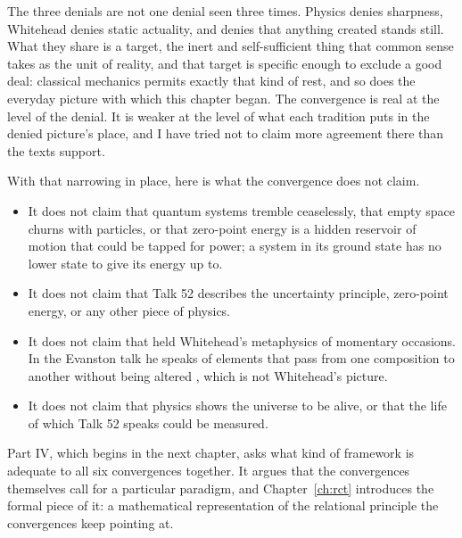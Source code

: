 The three denials are not one denial seen three times. Physics denies sharpness, Whitehead denies static actuality, and \AbdulBaha denies that anything created stands still. What they share is a target, the inert and self-sufficient thing that common sense takes as the unit of reality, and that target is specific enough to exclude a good deal: classical mechanics permits exactly that kind of rest, and so does the everyday picture with which this chapter began. The convergence is real at the level of the denial. It is weaker at the level of what each tradition puts in the denied picture's place, and I have tried not to claim more agreement there than the texts support.

With that narrowing in place, here is what the convergence does not claim.

\begin{itemize}
\item It does not claim that quantum systems tremble ceaselessly, that empty space churns with particles, or that zero-point energy is a hidden reservoir of motion that could be tapped for power; a system in its ground state has no lower state to give its energy up to.
\item It does not claim that Talk 52 describes the uncertainty principle, zero-point energy, or any other piece of physics.
\item It does not claim that \AbdulBaha held Whitehead's metaphysics of momentary occasions. In the Evanston talk he speaks of elements that pass from one composition to another without being altered \citep[Talk 38]{PUP}, which is not Whitehead's picture.
\item It does not claim that physics shows the universe to be alive, or that the life of which Talk 52 speaks could be measured.
\end{itemize}

Part IV, which begins in the next chapter, asks what kind of framework is adequate to all six convergences together. It argues that the convergences themselves call for a particular paradigm, and Chapter~\ref{ch:rct} introduces the formal piece of it: a mathematical representation of the relational principle the convergences keep pointing at.

